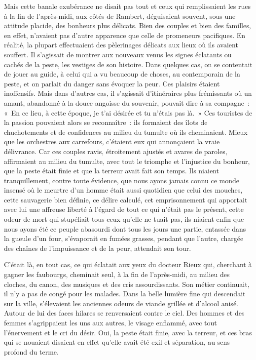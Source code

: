 \documentclass[french,twoside]{book} %
\begin{document}
Mais cette banale exubérance ne disait pas tout et ceux qui remplissaient les rues à la fin de l’après-midi, aux côtés de Rambert, déguisaient souvent, sous une attitude placide, des bonheurs plus délicats. Bien des couples et bien des familles, en effet, n’avaient pas d’autre apparence que celle de promeneurs pacifiques. En réalité, la plupart effectuaient des pèlerinages délicats aux lieux où ils avaient souffert. Il s’agissait de montrer aux nouveaux venus les signes éclatants ou cachés de la peste, les vestiges de son histoire. Dans quelques cas, on se contentait de jouer au guide, à celui qui a vu beaucoup de choses, au contemporain de la peste, et on parlait du danger sans évoquer la peur. Ces plaisirs étaient inoffensifs. Mais dans d’autres cas, il s’agissait d’itinéraires plus frémissants où un amant, abandonné à la douce angoisse du souvenir, pouvait dire à sa compagne : « En ce lieu, à cette époque, je t’ai désirée et tu n’étais pas là. » Ces touristes de la passion pouvaient alors se reconnaître : ils formaient des îlots de chuchotements et de confidences au milieu du tumulte où ils cheminaient. Mieux que les orchestres aux carrefours, c’étaient eux qui annonçaient la vraie délivrance. Car ces couples ravis, étroitement ajustés et avares de paroles, affirmaient au milieu du tumulte, avec tout le triomphe et l’injustice du bonheur, que la peste était finie et que la terreur avait fait son temps. Ils niaient tranquillement, contre toute évidence, que nous ayons jamais connu ce monde insensé où le meurtre d’un homme était aussi quotidien que celui des mouches, cette sauvagerie bien définie, ce délire calculé, cet emprisonnement qui apportait avec lui une affreuse liberté à l’égard de tout ce qui n’était pas le présent, cette odeur de mort qui stupéfiait tous ceux qu’elle ne tuait pas, ils niaient enfin que nous ayons été ce peuple abasourdi dont tous les jours une partie, entassée dans la gueule d’un four, s’évaporait en fumées grasses, pendant que l’autre, chargée des chaînes de l’impuissance et de la peur, attendait son tour.\par
C’était là, en tout cas, ce qui éclatait aux yeux du docteur Rieux qui, cherchant à gagner les faubourgs, cheminait seul, à la fin de l’après-midi, au milieu des cloches, du canon, des musiques et des cris assourdissants. Son métier continuait, il n’y a pas de congé pour les malades. Dans la belle lumière fine qui descendait sur la ville, s’élevaient les anciennes odeurs de viande grillée et d’alcool anisé. Autour de lui des faces hilares se renversaient contre le ciel. Des hommes et des femmes s’agrippaient les uns aux autres, le visage enflammé, avec tout l’énervement et le cri du désir. Oui, la peste était finie, avec la terreur, et ces bras qui se nouaient disaient en effet qu’elle avait été exil et séparation, au sens profond du terme.\par
\end{document}
